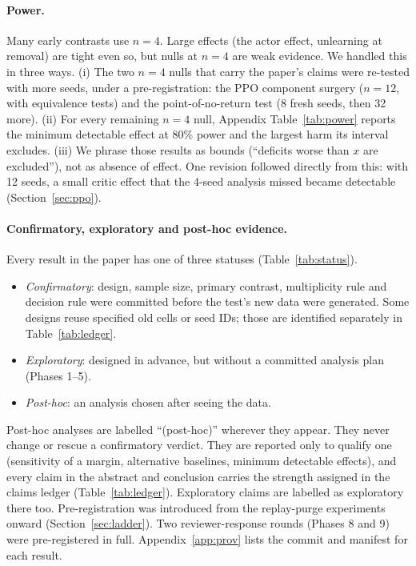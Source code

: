 \documentclass[10pt]{article} %
\begin{document}
\paragraph{Power.} Many early contrasts use $n=4$. Large effects (the actor effect, unlearning at removal) are tight even so, but nulls at $n=4$ are weak evidence. We handled this in three ways. (i) The two $n=4$ nulls that carry the paper's claims were re-tested with more seeds, under a pre-registration: the PPO component surgery ($n=12$, with equivalence tests) and the point-of-no-return test (8 fresh seeds, then 32 more). (ii) For every remaining $n=4$ null, Appendix Table~\ref{tab:power} reports the minimum detectable effect at 80\% power and the largest harm its interval excludes. (iii) We phrase those results as bounds (``deficits worse than $x$ are excluded''), not as absence of effect. One revision followed directly from this: with 12 seeds, a small critic effect that the 4-seed analysis missed became detectable (Section~\ref{sec:ppo}).

\paragraph{Confirmatory, exploratory and post-hoc evidence.} Every result in the paper has one of three statuses (Table~\ref{tab:status}).
\begin{itemize}
\item \emph{Confirmatory}: design, sample size, primary contrast, multiplicity rule and decision rule were committed before the test's new data were generated. Some designs reuse specified old cells or seed IDs; those are identified separately in Table~\ref{tab:ledger}.
\item \emph{Exploratory}: designed in advance, but without a committed analysis plan (Phases 1--5).
\item \emph{Post-hoc}: an analysis chosen after seeing the data.
\end{itemize}
Post-hoc analyses are labelled ``(post-hoc)'' wherever they appear. They never change or rescue a confirmatory verdict. They are reported only to qualify one (sensitivity of a margin, alternative baselines, minimum detectable effects), and every claim in the abstract and conclusion carries the strength assigned in the claims ledger (Table~\ref{tab:ledger}). Exploratory claims are labelled as exploratory there too. Pre-registration was introduced from the replay-purge experiments onward (Section~\ref{sec:ladder}). Two reviewer-response rounds (Phases 8 and 9) were pre-registered in full. Appendix~\ref{app:prov} lists the commit and manifest for each result.
\end{document}

